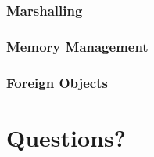 \documentclass{beamer}
\begin{document}
\begin{frame}
  \frametitle{Marshalling}

\end{frame}
\begin{frame}
  \frametitle{Memory Management}

\end{frame}
\begin{frame}
  \frametitle{Foreign Objects}

\end{frame}
\section{Questions?}
\end{document}
